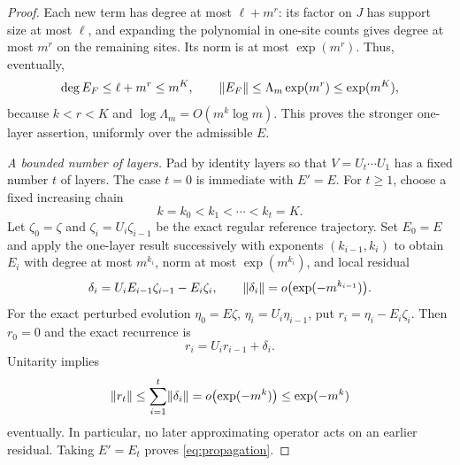 \begin{proof}
Each new term has degree at most $\ell+m^r$: its factor on $J$ has
support size at most $\ell$, and expanding the polynomial in one-site
counts gives degree at most $m^r$ on the remaining sites.
Its norm is at most $\exp(m^r)$.  Thus, eventually,
\[
 \deg E_F\le\ell+m^r\le m^K,
 \qquad
 \lVert E_F\rVert\le\Lambda_m\exp(m^r)\le\exp(m^K),
\]
because $k<r<K$ and $\log\Lambda_m=O(m^k\log m)$.
This proves the stronger one-layer assertion, uniformly over the
admissible $E$.

\emph{A bounded number of layers.}
Pad by identity layers so that $V=U_t\cdots U_1$ has a fixed number
$t$ of layers.  The case $t=0$ is immediate with $E'=E$.
For $t\ge1$, choose a fixed increasing chain
\[
 k=k_0<k_1<\cdots<k_t=K.
\]
Let $\zeta_0=\zeta$ and $\zeta_i=U_i\zeta_{i-1}$ be the exact regular
reference trajectory.  Set $E_0=E$ and apply the one-layer result
successively with exponents $(k_{i-1},k_i)$ to obtain $E_i$ with
degree at most $m^{k_i}$, norm at most $\exp(m^{k_i})$, and local
residual
\[
 \delta_i
 =U_iE_{i-1}\zeta_{i-1}-E_i\zeta_i,
 \qquad
 \lVert\delta_i\rVert=o\bigl(\exp(-m^{k_{i-1}})\bigr).
\]
For the exact perturbed evolution $\eta_0=E\zeta$,
$\eta_i=U_i\eta_{i-1}$, put $r_i=\eta_i-E_i\zeta_i$.
Then $r_0=0$ and the exact recurrence is
\[
 r_i=U_i r_{i-1}+\delta_i.
\]
Unitarity implies
\[
 \lVert r_t\rVert\le\sum_{i=1}^t\lVert\delta_i\rVert
 =o\bigl(\exp(-m^k)\bigr)
 \le\exp(-m^k)
\]
eventually.  In particular, no later approximating operator acts on an
earlier residual.  Taking $E'=E_t$ proves
\eqref{eq:propagation}.
\end{proof}
